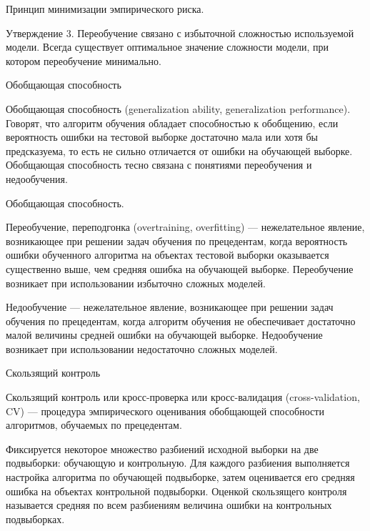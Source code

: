\documentclass[10pt,pdf,hyperref={unicode}]{beamer}
\begin{document}
\begin{frame}{Принцип минимизации эмпирического риска.}

Утверждение 3. Переобучение связано с избыточной сложностью используемой модели. Всегда существует оптимальное значение сложности модели, при котором переобучение минимально. 

\end{frame}

\begin{frame}{Обобщающая способность}

Обобщающая способность (generalization ability, generalization performance). Говорят, что алгоритм обучения обладает способностью к обобщению, если вероятность ошибки на тестовой выборке достаточно мала или хотя бы предсказуема, то есть не сильно отличается от ошибки на обучающей выборке. Обобщающая способность тесно связана с понятиями переобучения и недообучения.
\end{frame}

\begin{frame}{Обобщающая способность.}

Переобучение, переподгонка (overtraining, overfitting) — нежелательное явление, возникающее при решении задач обучения по прецедентам, когда вероятность ошибки обученного алгоритма на объектах тестовой выборки оказывается существенно выше, чем средняя ошибка на обучающей выборке. Переобучение возникает при использовании избыточно сложных моделей.

Недообучение — нежелательное явление, возникающее при решении задач обучения по прецедентам, когда алгоритм обучения не обеспечивает достаточно малой величины средней ошибки на обучающей выборке. Недообучение возникает при использовании недостаточно сложных моделей. 

\end{frame}

\begin{frame}{Скользящий контроль}

Скользящий контроль или кросс-проверка или кросс-валидация (cross-validation, CV) — процедура эмпирического оценивания обобщающей способности алгоритмов, 
обучаемых по прецедентам.

Фиксируется некоторое множество разбиений исходной выборки на две подвыборки: обучающую и контрольную. Для каждого разбиения выполняется 
настройка алгоритма по обучающей подвыборке, затем оценивается его средняя ошибка на объектах контрольной подвыборки.
Оценкой скользящего контроля называется средняя по всем разбиениям величина ошибки на контрольных подвыборках.

\end{frame}
\end{document}
